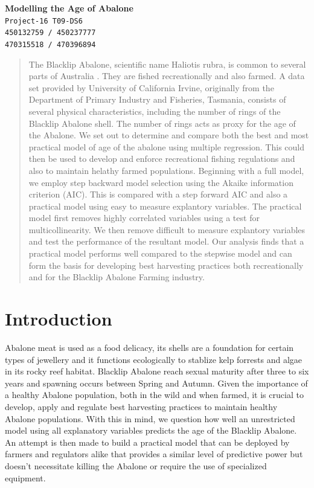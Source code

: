 \documentclass[10pt,twocolumn]{article}
\begin{document}
	\begin{center}
		\textbf{\Large Modelling the Age of Abalone} \\\vspace{4mm}
		\texttt{Project-16 T09-DS6\\450132759 / 450237777\\470315518 / 470396894}
	\end{center}
	\begin{abstract}
		The Blacklip Abalone, scientific name Haliotis rubra, is common to several parts of Australia \cite{source}. They are fished recreationally and also farmed. A data set provided by University of California Irvine, originally from the Department of Primary Industry and Fisheries, Tasmania, consists of several physical characteristics, including the number of rings of the Blacklip Abalone shell. The number of rings acts as proxy for the age of the Abalone. We set out to determine and compare both the best and most practical model of age of the abalone using multiple regression. This could then be used to develop and enforce recreational fishing regulations and also to maintain helathy farmed populations. Beginning with a full model, we employ step backward model selection using the Akaike information criterion (AIC). This is compared with a step forward AIC and also a practical model using easy to measure explantory variables. The practical model first removes highly correlated variables using a test for multicollinearity. We then remove difficult to measure explantory variables and test the performance of the resultant model. Our analysis finds that a practical model performs well compared to the stepwise model and can form the basis for developing best harvesting practices both recreationally and for the Blacklip Abalone Farming industry.
	\end{abstract}

	\section{Introduction}
		Abalone meat is used as a food delicacy, its shells are a foundation for certain types of jewellery and it functions ecologically to stablize kelp forrests and algae in its rocky reef habitat. Blacklip Abalone reach sexual maturity after three to six years and spawning occurs between Spring and Autumn\cite{blacklip}. Given the importance of a healthy Abalone population, both in the wild and when farmed, it is crucial to develop, apply and regulate best harvesting practices to maintain healthy Abalone populations. With this in mind, we question how well an unrestricted model using all explanatory variables predicts the age of the Blacklip Abalone. An attempt is then made to build a practical model that can be deployed by farmers and regulators alike that provides a similar level of predictive power but doesn't necessitate killing the Abalone or require the use of specialized equipment.					
\end{document}

